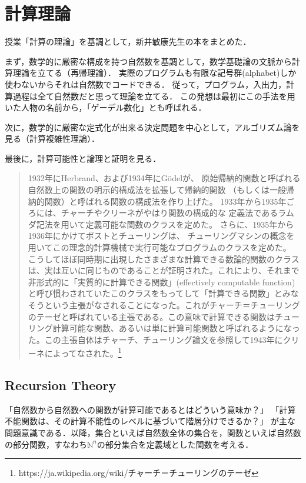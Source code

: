 \documentclass[uplatex, 12pt, dvipdfmx]{jsreport}
\begin{document}
\part{計算理論}
\begin{screen}
    授業「計算の理論」を基調として，新井敏康先生の本をまとめた．

    まず，数学的に厳密な構成を持つ自然数を基調として，数学基礎論の文脈から計算理論を立てる（再帰理論）．
    実際のプログラムも有限な記号群(alphabet)しか使わないからそれは自然数でコードできる．
    従って，プログラム，入出力，計算過程は全て自然数だと思って理論を立てる．
    この発想は最初にこの手法を用いた人物の名前から，「ゲーデル数化」とも呼ばれる．

    次に，数学的に厳密な定式化が出来る決定問題を中心として，アルゴリズム論を見る（計算複雑性理論）．

    最後に，計算可能性と論理と証明を見る．
\end{screen}
\begin{quote}
    1932年にHerbrand、および1934年にGödelが、
    原始帰納的関数と呼ばれる自然数上の関数の明示的構成法を拡張して帰納的関数
    （もしくは一般帰納的関数）と呼ばれる関数の構成法を作り上げた。
    1933年から1935年ごろには、チャーチやクリーネがやはり関数の構成的な
    定義法であるラムダ記法を用いて定義可能な関数のクラスを定めた。
    さらに、1935年から1936年にかけてポストとチューリングは、
    チューリングマシンの概念を用いてこの理念的計算機械で実行可能なプログラムのクラスを定めた。
    こうしてほぼ同時期に出現したさまざまな計算できる数論的関数のクラスは、実は互いに同じものであることが証明された。これにより、それまで非形式的に「実質的に計算できる関数」(effectively computable function) と呼び慣わされていたこのクラスをもってして「計算できる関数」とみなそうという主張がなされることになった。これがチャーチ＝チューリングのテーゼと呼ばれている主張である。この意味で計算できる関数はチューリング計算可能な関数、あるいは単に計算可能関数と呼ばれるようになった。この主張自体はチャーチ、チューリング論文を参照して1943年にクリーネによってなされた。\footnote{https://ja.wikipedia.org/wiki/チャーチ＝チューリングのテーゼ}
\end{quote}

\chapter{Recursion Theory}
「自然数から自然数への関数が計算可能であるとはどういう意味か？」
「計算不能関数は、その計算不能性のレベルに基づいて階層分けできるか？」
が主な問題意識である．以降，集合といえば自然数全体の集合を，関数といえば自然数の部分関数，すなわち$\mathbb{N}^n$の部分集合を定義域とした関数を考える．
\end{document}
